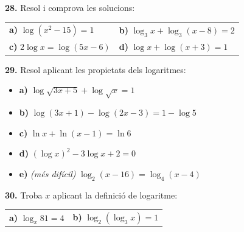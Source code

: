\documentclass[13pt,a4paper]{extarticle}
\begin{document}
\par\noindent\begin{minipage}{\linewidth}
\textbf{28.} Resol i comprova les solucions:\par


\begin{tabular}{@{}p{.46\linewidth}p{.46\linewidth}@{}}
\textbf{a)} $\log(x^2-15)=1$ & \textbf{b)} $\log_3 x+\log_3(x-8)=2$ \\[3pt]
\textbf{c)} $2\log x=\log(5x-6)$ & \textbf{d)} $\log x+\log(x+3)=1$ \\[3pt]
\end{tabular}\par
\end{minipage}\par\vspace{1.6mm}
\par\noindent\begin{minipage}{\linewidth}
\textbf{29.} Resol aplicant les propietats dels logaritmes:\par

\begin{itemize}[leftmargin=0pt,itemsep=6pt,topsep=4pt,parsep=0pt,label={}]
\item \textbf{a)} $\log\sqrt{3x+5}+\log\sqrt{x}=1$
\item \textbf{b)} $\log(3x+1)-\log(2x-3)=1-\log 5$
\item \textbf{c)} $\ln x+\ln(x-1)=\ln 6$
\item \textbf{d)} $(\log x)^2-3\log x+2=0$
\item \textbf{e)} \emph{(més difícil)} $\log_2(x-16)=\log_4(x-4)$
\end{itemize}
\end{minipage}\par\vspace{1.6mm}
\par\noindent\begin{minipage}{\linewidth}
\textbf{30.} Troba $x$ aplicant la definició de logaritme:\par


\begin{tabular}{@{}p{.46\linewidth}p{.46\linewidth}@{}}
\textbf{a)} $\log_x 81=4$ & \textbf{b)} $\log_2(\log_3 x)=1$ \\[3pt]
\end{tabular}\par
\end{minipage}\par\vspace{1.6mm}
\end{document}
